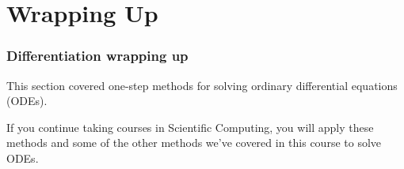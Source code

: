 \documentclass{if-beamer}
\begin{document}
\section{Wrapping Up}
\begin{frame}
	\frametitle{Differentiation wrapping up}
	This section covered one-step methods for solving ordinary differential equations (ODEs).\\\vspace{1cm} 
	
	If you continue taking courses in Scientific Computing, you will apply these methods and some of the other methods we've covered in this course to solve ODEs. 
\end{frame}
\end{document}
